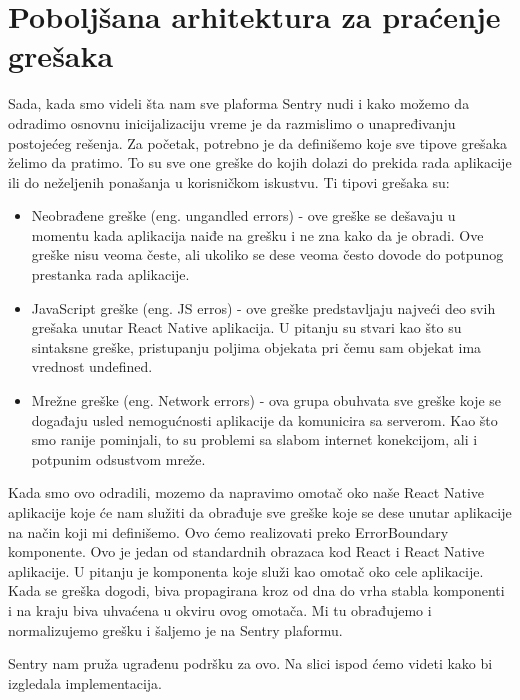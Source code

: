 \documentclass[12pt,oneside]{memoir}
\begin{document}
\section{Poboljšana arhitektura za praćenje grešaka}

Sada, kada smo videli šta nam sve plaforma Sentry nudi i kako možemo da odradimo osnovnu inicijalizaciju vreme je da razmislimo o unapređivanju postojećeg rešenja. Za početak, potrebno je da definišemo koje sve tipove grešaka želimo da pratimo. To su sve one greške do kojih dolazi do prekida rada aplikacije ili do neželjenih ponašanja u korisničkom iskustvu. Ti tipovi grešaka su:

\begin{itemize}
\item Neobrađene greške (eng. ungandled errors) - ove greške se dešavaju u momentu kada aplikacija naiđe na grešku i ne zna kako da je obradi. Ove greške nisu veoma česte, ali ukoliko se dese veoma često dovode do potpunog prestanka rada aplikacije.
\item JavaScript greške (eng. JS erros) - ove greške predstavljaju najveći deo svih grešaka unutar React Native aplikacija. U pitanju su stvari kao što su sintaksne greške, pristupanju poljima objekata pri čemu sam objekat ima vrednost undefined.
\item Mrežne greške (eng. Network errors) - ova grupa obuhvata sve greške koje se događaju usled nemogućnosti aplikacije da komunicira sa serverom. Kao što smo ranije pominjali, to su problemi sa slabom internet konekcijom, ali i potpunim odsustvom mreže.
\end{itemize}

Kada smo ovo odradili, mozemo da napravimo omotač oko naše React Native aplikacije koje će nam služiti da obrađuje sve greške koje se dese unutar aplikacije na način koji mi definišemo. Ovo ćemo realizovati preko ErrorBoundary komponente. Ovo je jedan od standardnih obrazaca kod React i React Native aplikacije. U pitanju je komponenta koje služi kao omotač oko cele aplikacije. Kada se greška dogodi, biva propagirana kroz od dna do vrha stabla komponenti i na kraju biva uhvaćena u okviru ovog omotača. Mi tu obrađujemo i normalizujemo grešku i šaljemo je na Sentry plaformu. \newline

\newline

Sentry nam pruža ugrađenu podršku za ovo. Na slici ispod ćemo videti kako bi izgledala implementacija.
\end{document}
